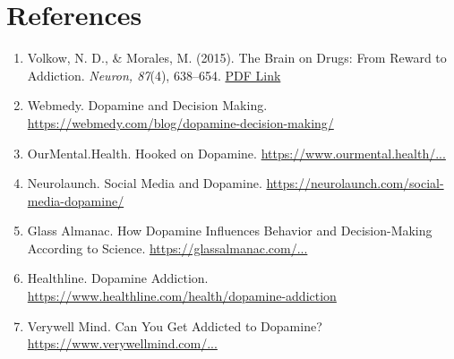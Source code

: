 \documentclass[a4paper,10pt,twocolumn]{memoir}
\begin{document}
\section*{References}

\begin{enumerate}
    \item Volkow, N. D., \& Morales, M. (2015). The Brain on Drugs: From Reward to Addiction. \textit{Neuron, 87}(4), 638–654. \href{https://www.cell.com/neuron/pdf/S0896-6273(15)00133-6.pdf}{PDF Link}
    \item Webmedy. Dopamine and Decision Making. \href{https://webmedy.com/blog/dopamine-decision-making/}{https://webmedy.com/blog/dopamine-decision-making/}
    \item OurMental.Health. Hooked on Dopamine. \href{https://www.ourmental.health/screen-time-sanity/hooked-on-dopamine-how-social-media-hijacks-your-brain}{https://www.ourmental.health/...}
    \item Neurolaunch. Social Media and Dopamine. \href{https://neurolaunch.com/social-media-dopamine/}{https://neurolaunch.com/social-media-dopamine/}
    \item Glass Almanac. How Dopamine Influences Behavior and Decision-Making According to Science. \href{https://glassalmanac.com/how-dopamine-influences-behavior-and-decision-making-according-to-science/}{https://glassalmanac.com/...}
    \item Healthline. Dopamine Addiction. \href{https://www.healthline.com/health/dopamine-addiction}{https://www.healthline.com/health/dopamine-addiction}
    \item Verywell Mind. Can You Get Addicted to Dopamine? \href{https://www.verywellmind.com/can-you-get-addicted-to-dopamine-5207433}{https://www.verywellmind.com/...}
\end{enumerate} 

\clearpage


\end{document}
